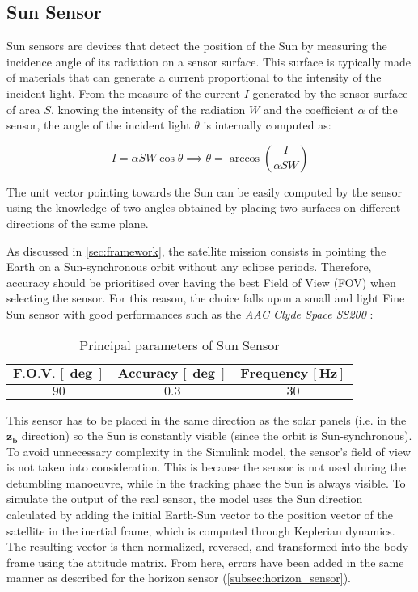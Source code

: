 \subsection{Sun Sensor}
\label{subsec:sun_sensor}

Sun sensors are devices that detect the position of the Sun by measuring the incidence angle of its radiation on a sensor surface. This surface is typically made of materials that can generate a current proportional to the intensity of the incident light. From the measure of the current $I$ generated by the sensor surface of area $S$, knowing the intensity of the radiation $W$ and the coefficient $\alpha$ of the sensor, the angle of the incident light $\theta$ is internally computed as:

\begin{equation}
    I = \alpha S W \cos \theta  \implies  \theta = \arccos \left( \frac{I}{\alpha S W} \right)
\end{equation}

The unit vector pointing towards the Sun can be easily computed by the sensor using the knowledge of two angles obtained by placing two surfaces on different directions of the same plane.

As discussed in \autoref{sec:framework}, the satellite mission consists in pointing the Earth on a Sun-synchronous orbit without any eclipse periods. Therefore, accuracy should be prioritised over having the best Field of View (FOV) when selecting the sensor. For this reason, the choice falls upon a small and light Fine Sun sensor with good performances such as the \textit{AAC Clyde Space SS200} \cite{sun_sensor_site}:

\begin{table}[H]

    \centering
    \begin{tabular}{|c|c|c|}
    \hline
    $\bm{F.O.V. \, [\deg]}$ & $\bm{Accuracy \, [\deg]}$ & $\bm{Frequency \, [Hz]}$ \\
    \hline
    $90$ & $0.3$ & $30$  \\
    \hline
    \end{tabular}
    
    \caption{Principal parameters of Sun Sensor}
    \label{table:Sun_sensor}
    
\end{table}

This sensor has to be placed in the same direction as the solar panels (i.e. in the $\boldsymbol{z_b}$ direction) so the Sun is constantly visible (since the orbit is Sun-synchronous). To avoid unnecessary complexity in the Simulink model, the sensor's field of view is not taken into consideration. This is because the sensor is not used during the detumbling manoeuvre, while in the tracking phase the Sun is always visible.
To simulate the output of the real sensor, the model uses the Sun direction calculated by adding the initial Earth-Sun vector to the position vector of the satellite in the inertial frame, which is computed through Keplerian dynamics. The resulting vector is then normalized, reversed, and transformed into the body frame using the attitude matrix. From here, errors have been added in the same manner as described for the horizon sensor (\autoref{subsec:horizon_sensor}).